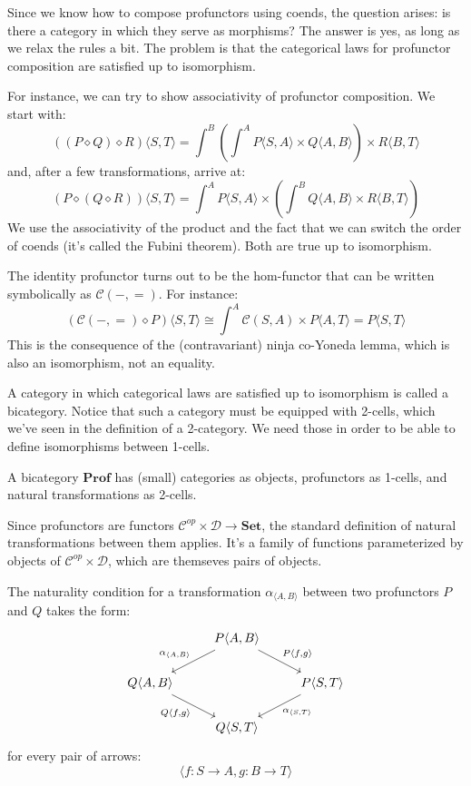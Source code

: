 \documentclass[DaoFP]{subfiles}
\begin{document}
Since we know how to compose profunctors using coends, the question arises: is there a category in which they serve as morphisms? The answer is yes, as long as we relax the rules a bit. The problem is that the categorical laws for profunctor composition are satisfied up to isomorphism. 

For instance, we can try to show associativity of profunctor composition. We start with:
\[ ((P \diamond Q) \diamond R) \langle S, T \rangle = \int^B \left( \int^A P \langle S, A \rangle \times Q \langle A, B \rangle \right) \times R \langle B,  T \rangle \]
and, after a few transformations, arrive at:
\[ (P \diamond (Q \diamond R)) \langle S, T \rangle =  \int^A P \langle S, A \rangle \times \left( \int^B Q \langle A, B \rangle \times R \langle B,  T \rangle \right) \]
We use the associativity of the product and the fact that we can switch the order of coends (it's called the  Fubini theorem). Both are true up to isomorphism.

The identity profunctor turns out to be the hom-functor that can be written symbolically as $\mathcal{C}(-, =)$. For instance:
\[ \left( \mathcal{C}(-, =) \diamond P \right) \langle S, T \rangle \cong \int^A  \mathcal{C}(S, A) \times P \langle A, T \rangle = P \langle S, T \rangle \]
This is the consequence of the (contravariant) ninja co-Yoneda lemma, which is also an isomorphism, not an equality.

A category in which categorical laws are satisfied up to isomorphism is called a bicategory. Notice that such a category must be equipped with 2-cells, which we've seen in the definition of a 2-category. We need those in order to be able to define isomorphisms between 1-cells. 

A bicategory $\mathbf{Prof}$ has (small) categories as objects, profunctors as 1-cells, and natural transformations as 2-cells. 

Since profunctors are functors $\mathcal{C}^{op} \times  \mathcal{D} \to \mathbf{Set}$, the standard definition of natural transformations between them applies. It's a family of functions parameterized by objects of $\mathcal{C}^{op} \times  \mathcal{D}$, which are themseves pairs of objects. 

The naturality condition for a transformation $\alpha_{\langle A, B \rangle}$ between two profunctors $P$ and $Q$ takes the form:
\[
 \begin{tikzcd}
 &P \langle A, B \rangle
 \arrow[ld, "{\alpha_{\langle A, B \rangle}}"']
 \arrow[rd, "{P \langle f, g \rangle}"]
 \\
 Q \langle A, B \rangle
 \arrow[dr, "{Q \langle f, g \rangle}"']
 &&P \langle S, T \rangle
 \arrow[dl, "{\alpha_{\langle S, T \rangle}}"]
 \\
 & Q \langle S, T \rangle
 \end{tikzcd}
\]
for every pair of arrows:
\[ \langle f \colon S \to A, g \colon B \to T \rangle \]
\end{document}
